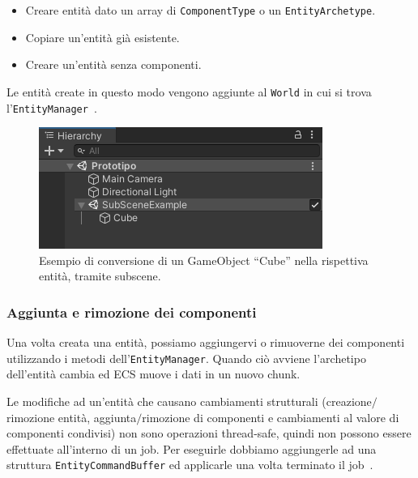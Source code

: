 \begin{itemize}
    \item Creare entità dato un array di \verb|ComponentType| o un \verb|EntityArchetype|.
    \item Copiare un'entità già esistente.
    \item Creare un'entità senza componenti. 
\end{itemize}

Le entità create in questo modo vengono aggiunte al \verb|World| in cui si trova l'\verb|EntityManager|~\cite{doc:unity-entities-api}.
   
\begin{figure}[!ht]
    \centering
    \includegraphics[width=0.70\columnwidth]{gfx/imgs/chapter2/SubSceneConversionWorkflow.png}
    \caption{Esempio di conversione di un GameObject ``Cube'' nella rispettiva entità, tramite subscene.}
    \label{fig:subscene-example}
\end{figure}

\subsubsection{Aggiunta e rimozione dei componenti}

Una volta creata una entità, possiamo aggiungervi o rimuoverne dei componenti utilizzando i metodi dell'\verb|EntityManager|. Quando ciò avviene l'archetipo dell'entità cambia ed ECS muove i dati in un nuovo chunk.

Le modifiche ad un'entità che causano cambiamenti strutturali (creazione$/$rimozione entità, aggiunta$/$rimozione di componenti e cambiamenti al valore di componenti condivisi) non sono operazioni thread-safe, quindi non possono essere effettuate all'interno di un job. Per eseguirle dobbiamo aggiungerle ad una struttura \verb|EntityCommandBuffer| ed applicarle una volta terminato il job~\cite{doc:unity-entities-api}.

